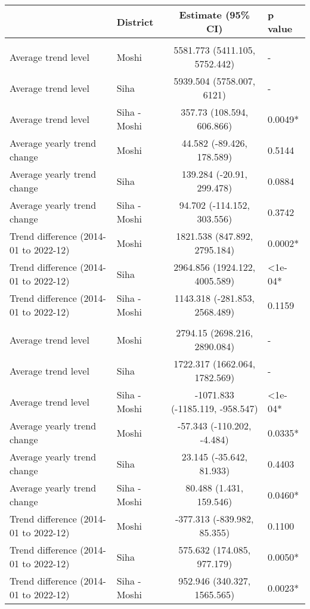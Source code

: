 \begin{longtable}{l|lcl}
\toprule
\multicolumn{1}{l}{} & District & Estimate (95\% CI) & p value \\ 
\midrule\addlinespace[2.5pt]
\multicolumn{4}{l}{Infectious/Communicable Diseases} \\ 
\midrule\addlinespace[2.5pt]
Average trend level & Moshi & 5581.773 (5411.105, 5752.442) & - \\ 
Average trend level & Siha & 5939.504 (5758.007, 6121) & - \\ 
Average trend level & Siha - Moshi & 357.73 (108.594, 606.866) & 0.0049* \\ 
Average yearly trend change & Moshi & 44.582 (-89.426, 178.589) & 0.5144 \\ 
Average yearly trend change & Siha & 139.284 (-20.91, 299.478) & 0.0884 \\ 
Average yearly trend change & Siha - Moshi & 94.702 (-114.152, 303.556) & 0.3742 \\ 
Trend difference (2014-01 to 2022-12) & Moshi & 1821.538 (847.892, 2795.184) & 0.0002* \\ 
Trend difference (2014-01 to 2022-12) & Siha & 2964.856 (1924.122, 4005.589) & <1e-04* \\ 
Trend difference (2014-01 to 2022-12) & Siha - Moshi & 1143.318 (-281.853, 2568.489) & 0.1159 \\ 
\midrule\addlinespace[2.5pt]
\multicolumn{4}{l}{Non-Communicable Diseases} \\ 
\midrule\addlinespace[2.5pt]
Average trend level & Moshi & 2794.15 (2698.216, 2890.084) & - \\ 
Average trend level & Siha & 1722.317 (1662.064, 1782.569) & - \\ 
Average trend level & Siha - Moshi & -1071.833 (-1185.119, -958.547) & <1e-04* \\ 
Average yearly trend change & Moshi & -57.343 (-110.202, -4.484) & 0.0335* \\ 
Average yearly trend change & Siha & 23.145 (-35.642, 81.933) & 0.4403 \\ 
Average yearly trend change & Siha - Moshi & 80.488 (1.431, 159.546) & 0.0460* \\ 
Trend difference (2014-01 to 2022-12) & Moshi & -377.313 (-839.982, 85.355) & 0.1100 \\ 
Trend difference (2014-01 to 2022-12) & Siha & 575.632 (174.085, 977.179) & 0.0050* \\ 
Trend difference (2014-01 to 2022-12) & Siha - Moshi & 952.946 (340.327, 1565.565) & 0.0023* \\ 
\bottomrule
\end{longtable}

